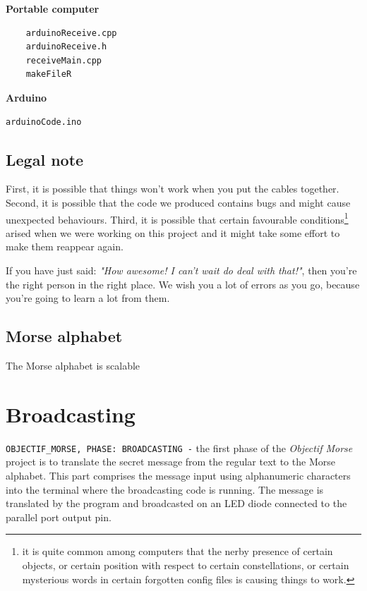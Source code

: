 \documentclass[12pt]{report}
\begin{document}
\textbf{Portable computer}

\begin{verbatim}
	arduinoReceive.cpp
	arduinoReceive.h
	receiveMain.cpp
	makeFileR
\end{verbatim}

\textbf{Arduino}

\begin{verbatim}
arduinoCode.ino
\end{verbatim}

\section{Legal note}

First, it is possible that things won't work when you put the cables together. Second, it is possible that the code we produced contains bugs and might cause unexpected behaviours. Third, it is possible that certain favourable conditions\footnote{it is quite common among computers that the nerby presence of certain objects, or certain position with respect to certain constellations, or certain mysterious words in certain forgotten config files is causing things to work.} arised when we were working on this project and it might take some effort to make them reappear again.

If you have just said: \textit{"How awesome! I can't wait do deal with that!"}, then you're the right person in the right place. We wish you a lot of errors as you go, because you're going to learn a lot from them. 

\section{Morse alphabet}





The Morse alphabet is scalable



\newpage

\chapter{Broadcasting}

\verb|OBJECTIF_MORSE, PHASE: BROADCASTING -| the first phase of the \textit{Objectif Morse} project is to translate the secret message from the regular text to the Morse alphabet. This part comprises the message input using alphanumeric characters into the terminal where the broadcasting code is running. The message is translated by the program and broadcasted on an LED diode connected to the parallel port output pin.
\end{document}
